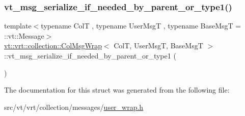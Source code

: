 \mbox{\label{structvt_1_1vrt_1_1collection_1_1_col_msg_wrap_a016c2ea5370660027aa23dc0dcf44a74}} 
\subsubsection{\texorpdfstring{vt\+\_\+msg\+\_\+serialize\+\_\+if\+\_\+needed\+\_\+by\+\_\+parent\+\_\+or\+\_\+type1()}{vt\_msg\_serialize\_if\_needed\_by\_parent\_or\_type1()}}
{\footnotesize\ttfamily template$<$typename ColT , typename User\+MsgT , typename Base\+MsgT  = \+::vt\+::\+Message$>$ \\
\hyperlink{structvt_1_1vrt_1_1collection_1_1_col_msg_wrap}{vt\+::vrt\+::collection\+::\+Col\+Msg\+Wrap}$<$ ColT, User\+MsgT, Base\+MsgT $>$\+::vt\+\_\+msg\+\_\+serialize\+\_\+if\+\_\+needed\+\_\+by\+\_\+parent\+\_\+or\+\_\+type1 (\begin{DoxyParamCaption}\item[{User\+MsgT}]{ }\end{DoxyParamCaption})}



The documentation for this struct was generated from the following file\+:\begin{DoxyCompactItemize}
\item 
src/vt/vrt/collection/messages/\hyperlink{user__wrap_8h}{user\+\_\+wrap.\+h}\end{DoxyCompactItemize}
